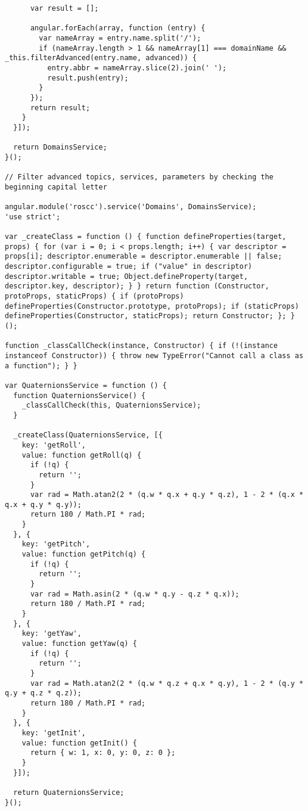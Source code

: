 \begin{verbatim}
      var result = [];

      angular.forEach(array, function (entry) {
        var nameArray = entry.name.split('/');
        if (nameArray.length > 1 && nameArray[1] === domainName && _this.filterAdvanced(entry.name, advanced)) {
          entry.abbr = nameArray.slice(2).join(' ');
          result.push(entry);
        }
      });
      return result;
    }
  }]);

  return DomainsService;
}();

// Filter advanced topics, services, parameters by checking the beginning capital letter

angular.module('roscc').service('Domains', DomainsService);
'use strict';

var _createClass = function () { function defineProperties(target, props) { for (var i = 0; i < props.length; i++) { var descriptor = props[i]; descriptor.enumerable = descriptor.enumerable || false; descriptor.configurable = true; if ("value" in descriptor) descriptor.writable = true; Object.defineProperty(target, descriptor.key, descriptor); } } return function (Constructor, protoProps, staticProps) { if (protoProps) defineProperties(Constructor.prototype, protoProps); if (staticProps) defineProperties(Constructor, staticProps); return Constructor; }; }();

function _classCallCheck(instance, Constructor) { if (!(instance instanceof Constructor)) { throw new TypeError("Cannot call a class as a function"); } }

var QuaternionsService = function () {
  function QuaternionsService() {
    _classCallCheck(this, QuaternionsService);
  }

  _createClass(QuaternionsService, [{
    key: 'getRoll',
    value: function getRoll(q) {
      if (!q) {
        return '';
      }
      var rad = Math.atan2(2 * (q.w * q.x + q.y * q.z), 1 - 2 * (q.x * q.x + q.y * q.y));
      return 180 / Math.PI * rad;
    }
  }, {
    key: 'getPitch',
    value: function getPitch(q) {
      if (!q) {
        return '';
      }
      var rad = Math.asin(2 * (q.w * q.y - q.z * q.x));
      return 180 / Math.PI * rad;
    }
  }, {
    key: 'getYaw',
    value: function getYaw(q) {
      if (!q) {
        return '';
      }
      var rad = Math.atan2(2 * (q.w * q.z + q.x * q.y), 1 - 2 * (q.y * q.y + q.z * q.z));
      return 180 / Math.PI * rad;
    }
  }, {
    key: 'getInit',
    value: function getInit() {
      return { w: 1, x: 0, y: 0, z: 0 };
    }
  }]);

  return QuaternionsService;
}();


\end{verbatim}
